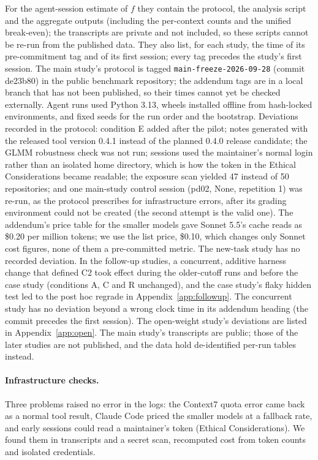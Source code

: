 \documentclass[11pt]{article}
\newcommand{\code}[1]{\texttt{#1}}
\newcommand{\aNone}{\textsf{None}\xspace}
\begin{document}
For the agent-session estimate of $f$ they contain the protocol, the analysis script and the aggregate outputs (including the per-context counts and the unified break-even); the transcripts are private and not included, so these scripts cannot be re-run from the published data.
They also list, for each study, the time of its pre-commitment tag and of its first session; every tag precedes the study's first session. The main study's protocol is tagged \code{main-freeze-2026-09-28} (commit de23b80) in the public benchmark repository; the addendum tags are in a local branch that has not been published, so their times cannot yet be checked externally.
Agent runs used Python 3.13, wheels installed offline from hash-locked environments, and fixed seeds for the run order and the bootstrap.
Deviations recorded in the protocol: condition E added after the pilot; notes generated with the released tool version 0.4.1 instead of the planned 0.4.0 release candidate; the GLMM robustness check was not run; sessions used the maintainer's normal login rather than an isolated home directory, which is how the token in the Ethical Considerations became readable; the exposure scan yielded 47 instead of 50 repositories; and one main-study control session (pd02, \aNone, repetition 1) was re-run, as the protocol prescribes for infrastructure errors, after its grading environment could not be created (the second attempt is the valid one). The addendum's price table for the smaller models gave Sonnet 5.5's cache reads as \$0.20 per million tokens; we use the list price, \$0.10, which changes only Sonnet cost figures, none of them a pre-committed metric. The new-task study has no recorded deviation. In the follow-up studies, a concurrent, additive harness change that defined C2 took effect during the older-cutoff runs and before the case study (conditions A, C and R unchanged), and the case study's flaky hidden test led to the post hoc regrade in Appendix~\ref{app:followup}. The concurrent study has no deviation beyond a wrong clock time in its addendum heading (the commit precedes the first session). The open-weight study's deviations are listed in Appendix~\ref{app:open}.
The main study's transcripts are public; those of the later studies are not published, and the data hold de-identified per-run tables instead.

\paragraph{Infrastructure checks.}
Three problems raised no error in the logs: the Context7 quota error came back as a normal tool result, Claude Code priced the smaller models at a fallback rate, and early sessions could read a maintainer's token (Ethical Considerations).
We found them in transcripts and a secret scan, recomputed cost from token counts and isolated credentials.
\end{document}
